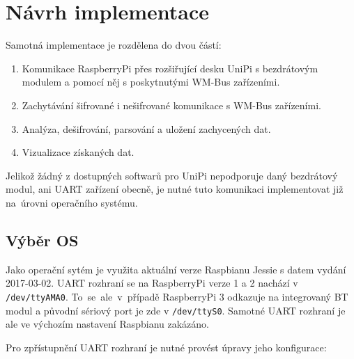 \chapter{Návrh implementace}
\label{ChapterImplementace}

Samotná implementace je rozdělena do dvou částí:
\begin{enumerate}
	\item Komunikace RaspberryPi přes rozšiřující desku UniPi s bezdrátovým modulem a pomocí něj s poskytnutými WM-Bus zařízeními.
	\item Zachytávání šifrované i nešifrované komunikace s WM-Bus zařízeními. 
	\item Analýza, dešifrování, parsování a uložení zachycených dat. 
	\item Vizualizace získaných dat.
\end{enumerate}

Jelikož žádný z dostupných softwarů pro UniPi nepodporuje daný bezdrátový modul, ani UART zařízení obecně, je nutné tuto komunikaci implementovat již na~úrovni operačního systému.


\section{Výběr OS}
Jako operační sytém je využita aktuální verze Raspbianu Jessie s datem vydání 2017-03-02. UART rozhraní se na RaspberryPi verze 1 a 2 nachází v \texttt{/dev/ttyAMA0}. To~se~ale~v~případě RaspberryPi 3 odkazuje na integrovaný BT modul a původní sériový port je zde v \texttt{/dev/ttyS0}. Samotné UART rozhraní je ale ve výchozím nastavení Raspbianu zakázáno.

Pro zpřístupnění UART rozhraní je nutné provést úpravy jeho konfigurace:



